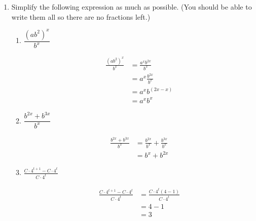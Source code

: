 \documentclass{article}
\begin{document}
\begin{enumerate}[resume, topsep=0pt]
\item 
  Simplify the following expression as much as possible. (You should be able to write them all so there are no fractions left.)

  \begin{enumerate}

  \item
    \begin{problem}[\vfill]
      $\dfrac{(ab^2)^x}{b^x}$
    \end{problem}

    \begin{solution}
      \begin{align*}
        \frac{(ab^2)^x}{b^x} &= \frac{a^xb^{2x}}{b^x} \\
        &= a^x \frac{b^{2x}}{b^x} \\
        &= a^x b^{(2x-x)} \\
        &= \boxed{a^x b^x}
      \end{align*}
    \end{solution}

  \item


    \begin{problem}[\vfill]
      $\dfrac{b^{2x} + b^{3x}}{b^x}$
    \end{problem}

    \begin{solution}
      \begin{align*}
        \frac{b^{2x}+b^{3x}}{b^x} &= \frac{b^{2x}}{b^x} + \frac{b^{3x}}{b^x} \\
        &= \boxed{b^x + b^{2x}}
      \end{align*}
    \end{solution}

  \item
    \begin{problem}[\nstretch{1.5}]
      $\displaystyle \frac{C \cdot 4^{t + 1} - C \cdot 4^t}{C \cdot 4^{t}}$
    \end{problem}

    \begin{solution}
      \begin{align*}
        \frac{C \cdot 4^{t + 1} - C \cdot 4^t}{C \cdot 4^t} &= \frac{C \cdot
          4^t ( 4 - 1)}{C \cdot 4^t} \\
        &= 4 - 1 \\
        &= \boxed{3}
      \end{align*}
    \end{solution}


\end{enumerate}
\end{enumerate}
\end{document}
